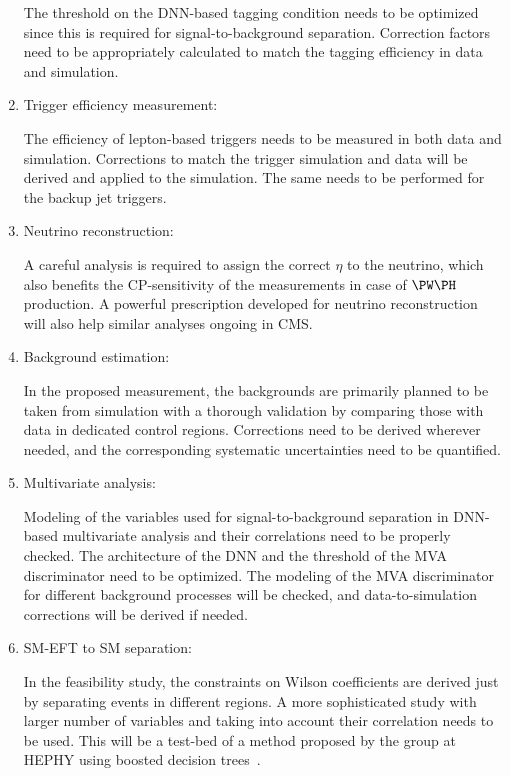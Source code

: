 \documentclass[a4paper,11pt]{article}
\begin{document}
\begin{enumerate}
The threshold on the DNN-based \PH tagging condition needs to be optimized since this is required for signal-to-background separation. 
Correction factors need to be appropriately calculated to match the tagging efficiency in data and simulation.

\item Trigger efficiency measurement:

The efficiency of lepton-based triggers needs to be measured in both data and simulation. 
Corrections to match the trigger simulation and data will be derived and applied to the simulation. 
The same needs to be performed for the backup jet triggers. 

\item Neutrino reconstruction:

A careful analysis is required to assign the correct $\eta$ to the neutrino, which also benefits the CP-sensitivity of the measurements in case of $\PW\PH$ production. 
A powerful prescription developed for neutrino reconstruction will also help similar analyses ongoing in CMS. 

\item Background estimation:

In the proposed measurement, the backgrounds are primarily planned to be taken from simulation with a thorough validation by comparing those with data in dedicated control regions. 
Corrections need to be derived wherever needed, and the corresponding systematic uncertainties need to be quantified.   

\item Multivariate analysis: 

Modeling of the variables used for signal-to-background separation in DNN-based multivariate analysis and their correlations need to be properly checked. 
The architecture of the DNN and the threshold of the MVA discriminator need to be optimized. 
The modeling of the MVA discriminator for different background processes will be checked, 
and data-to-simulation corrections will be derived if needed. 

\item SM-EFT to SM separation: 

In the feasibility study, the constraints on Wilson coefficients are derived just by separating events in different regions. A more sophisticated study with larger number of variables and taking into account their correlation needs to be used. 
This will be a test-bed of a method proposed by the group at HEPHY using boosted decision trees~\cite{Chatterjee:2021nms}. 


\end{enumerate}
\end{document}
